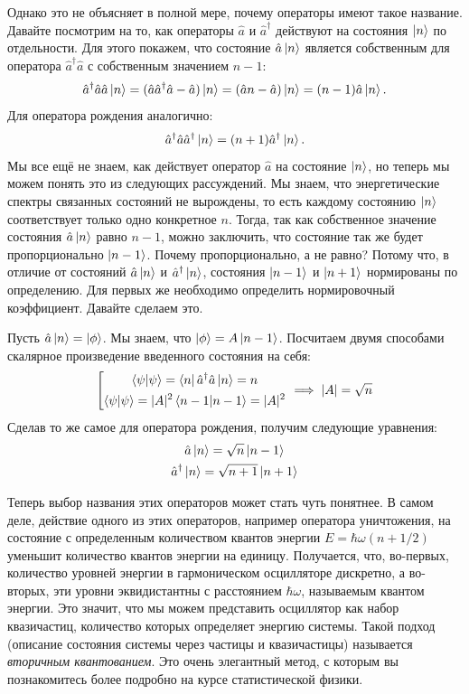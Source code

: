 Однако это не объясняет в полной мере, почему операторы имеют такое название. Давайте посмотрим на то, как операторы $\hat{a}$ и $\hat{a}^{\dagger}$ действуют на состояния $\ket{n}$ по отдельности. Для этого покажем, что состояние $\hat{a}\ket{n}$ является собственным для оператора $\hat{a}^{\dagger}\hat{a}$ с собственным значением $n-1$:
\[
\hat{a}^{\dagger}\hat{a}\hat{a}\ket{n} = (\hat{a}\hat{a}^{\dagger}\hat{a} - \hat{a})\ket{n} = (\hat{a}n - \hat{a})\ket{n} = (n-1)\hat{a}\ket{n}.
\]
Для оператора рождения аналогично:
\[
\hat{a}^{\dagger}\hat{a}\hat{a}^{\dagger}\ket{n} = (n+1)\hat{a}^{\dagger}\ket{n}.
\]
Мы все ещё не знаем, как действует оператор $\hat{a}$ на состояние $\ket{n}$, но теперь мы можем понять это из следующих рассуждений. Мы знаем, что энергетические спектры связанных состояний не вырождены, то есть каждому состоянию $\ket{n}$ соответствует только одно конкретное $n$. Тогда, так как собственное значение состояния $\hat{a}\ket{n}$ равно $n-1$, можно заключить, что состояние так же будет пропорционально $\ket{n-1}$. Почему пропорционально, а не равно? Потому что, в отличие от состояний $\hat{a}\ket{n}$ и $\hat{a}^{\dagger}\ket{n}$, состояния $\ket{n-1}$ и $\ket{n+1}$ нормированы по определению. Для первых же необходимо определить нормировочный коэффициент. Давайте сделаем это.

Пусть $\hat{a}\ket{n} = \ket{\phi}$. Мы знаем, что $\ket{\phi} = A\ket{n-1}$. Посчитаем двумя способами скалярное произведение введенного состояния на себя:
\[
\left[
\begin{gathered}
\bra{\psi}\ket{\psi} = \bra{n}\hat{a}^{\dagger}\hat{a}\ket{n} = n\\
\bra{\psi}\ket{\psi} = |A|^2\bra{n-1}\ket{n-1} = |A|^2
\end{gathered}
\right. \implies |A| = \sqrt{n}
\]
Сделав то же самое для оператора рождения, получим следующие уравнения:
\begin{gather*}
\hat{a}\ket{n} = \sqrt{n}\ket{n-1}\\
\hat{a}^{\dagger}\ket{n} = \sqrt{n+1}\ket{n+1}
\end{gather*}

Теперь выбор названия этих операторов может стать чуть понятнее. В самом деле, действие одного из этих операторов, например оператора уничтожения, на состояние с определенным количеством квантов энергии $E = \hbar\omega(n + 1/2)$ уменьшит количество квантов энергии на единицу. Получается, что, во-первых, количество уровней энергии в гармоническом осцилляторе дискретно, а во-вторых, эти уровни эквидистантны с расстоянием $\hbar\omega$, называемым квантом энергии. Это значит, что мы можем представить осциллятор как набор квазичастиц, количество которых определяет энергию системы. Такой подход (описание состояния системы через частицы и квазичастицы) называется \textit{вторичным квантованием}. Это очень элегантный метод, с которым вы познакомитесь более подробно на курсе статистической физики.

